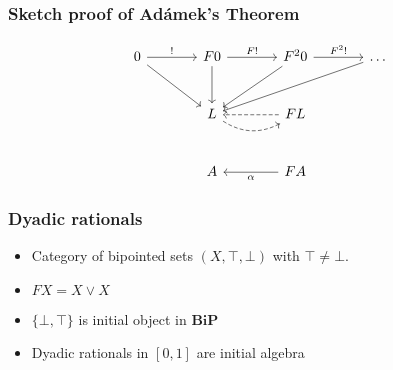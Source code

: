 \documentclass{beamer}
\begin{document}
\subsection{}
\begin{frame}
  \frametitle{Sketch proof of Ad\'amek's Theorem}
        \begin{equation*}
          \begin{tikzcd}[ampersand replacement=\&, sep=large]
            0 \rar{!} \arrow[rd] \& F0 \rar{F!} \arrow[d] \& F^2 0 \rar{F^2 !} \arrow[ld] \& \dots \arrow[lld] \\
            \& L \arrow[r, dashed, bend right] \& FL \arrow[l, dashed] \\
            \& A \& FA \arrow[l, "\alpha"]
          \end{tikzcd}
        \end{equation*}
\end{frame}
\begin{frame}[fragile]
  \frametitle{Dyadic rationals}
  \begin{itemize}
    \item Category of bipointed sets $(X, \top, \bot)$ with $\top \neq \bot$.
    \item $FX = X \vee X$
      \begin{center}
      \end{center}
    \item $\{\bot, \top\}$ is initial object in $\mathbf{BiP}$
    \item Dyadic rationals in $[0,1]$ are initial algebra
  \end{itemize}
\end{frame}
\end{document}
